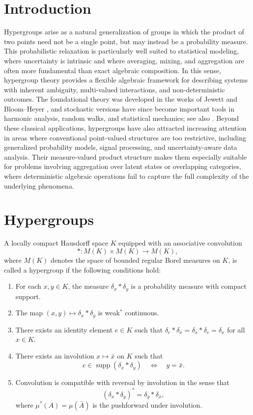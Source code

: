 \documentclass[twoside]{article}
\begin{document}
\section{Introduction}

Hypergroups arise as a natural generalization of groups in which the product of two points need not be a single point, but may instead be a probability measure. This probabilistic relaxation is particularly well suited to statistical modeling, where uncertainty is intrinsic and where averaging, mixing, and aggregation are often more fundamental than exact algebraic composition. In this sense, hypergroup theory provides a flexible algebraic framework for describing systems with inherent ambiguity, multi-valued interactions, and non-deterministic outcomes.
The foundational theory was developed in the works of Jewett \cite{Jewett:1975} and Bloom–Heyer \cite{BloomHeyer:1995}, and stochastic versions have since become important tools in harmonic analysis, random walks, and statistical mechanics; see also \cite{Ross:2012,Voit:2014}. Beyond these classical applications, hypergroups have also attracted increasing attention in areas where conventional point-valued structures are too restrictive, including generalized probability models, signal processing, and uncertainty-aware data analysis. Their measure-valued product structure makes them especially suitable for problems involving aggregation over latent states or overlapping categories, where deterministic algebraic operations fail to capture the full complexity of the underlying phenomena.
\section{Hypergroups}

\begin{dfn}[Hypergroup]
 A locally compact Hausdorff space $K$ equipped with an associative convolution \[ *: M(K)\times M(K)\to M(K), \] where $M(K)$ denotes the space of bounded regular Borel measures on $K$, is called a hypergroup if the following conditions hold:
\begin{enumerate}
\item For each $x,y\in K$, the measure $\delta_x * \delta_y$ is a probability measure with compact support. 
\item The map $(x,y)\mapsto \delta_x * \delta_y$ is weak$^*$ continuous. 
\item There exists an identity element $e\in K$ such that $\delta_e * \delta_x = \delta_x * \delta_e = \delta_x$ for all $x\in K$.
 \item There exists an involution $x\mapsto \bar x$ on $K$ such that \[ e\in \operatorname{supp}(\delta_x * \delta_y)\quad \Longleftrightarrow \quad y=\bar x. \] 
 \item Convolution is compatible with reversal by involution in the sense that \[ (\delta_x * \delta_y)^\ast = \delta_{\bar y} * \delta_{\bar x}, \] where $\mu^\ast(A)=\mu(\bar A)$ is the pushforward under involution. 
 \end{enumerate} 
 \end{dfn} 
 
\end{document}
